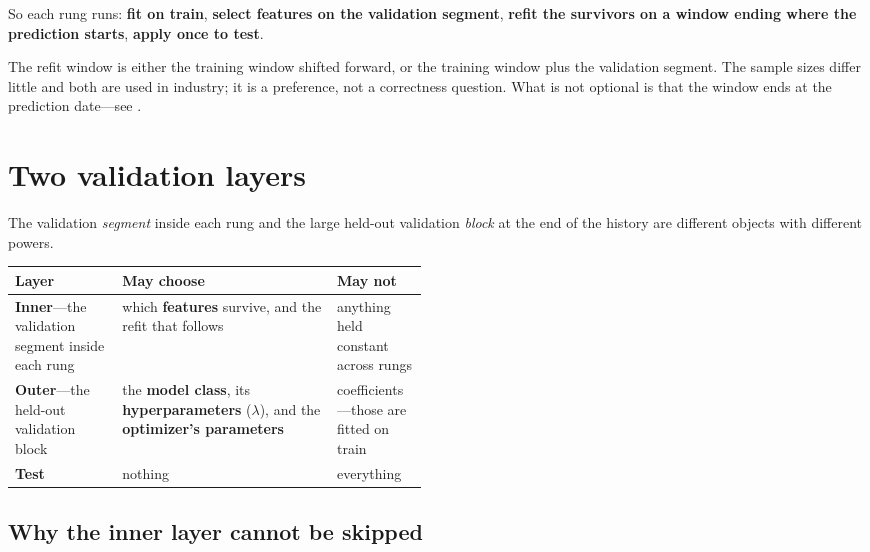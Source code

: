 So each rung runs: \textbf{fit on train}, \textbf{select features on the validation segment},
\textbf{refit the survivors on a window ending where the prediction starts}, \textbf{apply once to
test}.

\begin{note}
The refit window is either the training window shifted forward, or the training window plus the
validation segment. The sample sizes differ little and both are used in industry; it is a
preference, not a correctness question. What is not optional is that the window ends at the
prediction date---see .
\end{note}


\section{Two validation layers}\label{sec:two-layers}

The validation \emph{segment} inside each rung and the large held-out validation \emph{block} at
the end of the history are different objects with different powers.


\begin{tabularx}{\linewidth}{|>{\raggedright\arraybackslash}p{0.26\linewidth}|X|>{\raggedright\arraybackslash}p{0.22\linewidth}|}
\hline
\textbf{Layer} & \textbf{May choose} & \textbf{May not} \\ \hline
\textbf{Inner}---the validation segment inside each rung
  & which \textbf{features} survive, and the refit that follows
  & anything held constant across rungs \\ \hline
\textbf{Outer}---the held-out validation block
  & the \textbf{model class}, its \textbf{hyperparameters} ($\lambda$), and the
    \textbf{optimizer's parameters}
  & coefficients---those are fitted on train \\ \hline
\textbf{Test} & nothing & everything \\ \hline
\end{tabularx}

\subsection{Why the inner layer cannot be skipped}\label{sec:inner}

